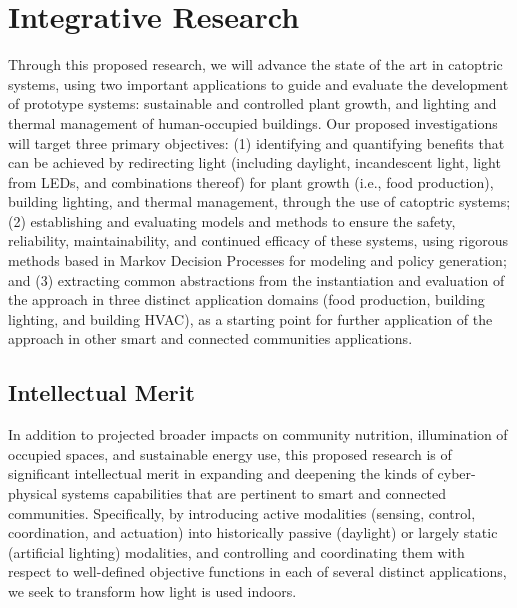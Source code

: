 \section{Integrative Research}
\label{sec:research}


Through this proposed research, we will advance the state of the art in
catoptric systems, using two important applications to guide and evaluate the
development of prototype systems: sustainable and controlled plant growth,
and lighting
and thermal management of human-occupied buildings. Our proposed investigations
will target three primary objectives: (1) identifying and quantifying benefits
that can be achieved by redirecting light (including daylight, incandescent
light, light from LEDs, and combinations thereof) for 
plant growth (i.e., food production),
building lighting, and thermal management, through the use of
catoptric systems; (2) establishing and evaluating models and methods to ensure
the safety, reliability, maintainability, and continued efficacy of these
systems, using rigorous methods based in Markov Decision Processes for modeling
and policy generation; and (3) extracting common abstractions from the
instantiation and evaluation of the approach in three distinct application
domains (food production, building lighting, and building HVAC), as a starting
point for further application of the approach in other smart and connected
communities applications.

\subsection{Intellectual Merit}
\label{sec:im}

In addition to projected broader impacts on community nutrition, illumination
of occupied spaces, and sustainable energy use, this proposed research is of
significant intellectual merit in expanding and deepening the kinds of
cyber-physical systems capabilities that are pertinent to smart and connected
communities. Specifically, by introducing active modalities (sensing, control,
coordination, and actuation) into historically passive (daylight) or largely
static (artificial lighting) modalities, and controlling and coordinating them
with respect to well-defined objective functions in each of several distinct
applications, we seek to transform how light is used indoors.  

